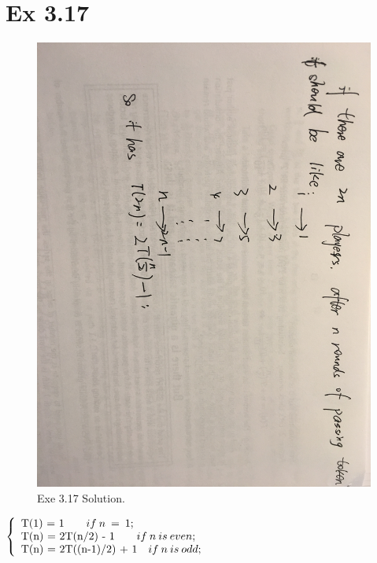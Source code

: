 \section{Ex 3.17}
\begin{figure}[h!]
  \includegraphics[width=\linewidth]{EX17.jpeg}
  \caption{Exe 3.17 Solution.}
  \label{fig:solution 3.17}
\end{figure}

\begin{math}
  \left\{
    \begin{array}{l}
      $T(1) = 1$             \qquad             if \: n \:  = \: 1;\\
      $T(n) = 2T(n/2) - 1$     \qquad      if  \: n  \: is \: even;\\
      $T(n) = 2T((n-1)/2) + 1$    \quad   if  \: n \:  is \: odd;
    \end{array}
  \right.
\end{math}


